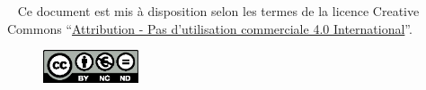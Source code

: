 \mbox{~}
\vfill
Ce document est mis à disposition selon les termes de la licence Creative
Commons ``\href{https://creativecommons.org/licenses/by-nc-nd/4.0/}{Attribution -
Pas d'utilisation commerciale 4.0 International}''.

\begin{figure}[!h]
  \centering
  \includegraphics[width=0.25\textwidth]
  {textures/images/license/license.eps}
\end{figure}

\thispagestyle{empty}
